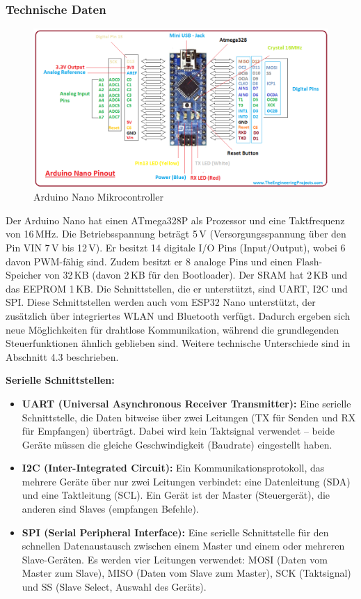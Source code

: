 \subsubsection{Technische Daten}
\begin{figure}[H]
    \centering
    \includegraphics[width=1\textwidth]{img/Hardware/arduino_nano.png}
    \caption{Arduino Nano Mikrocontroller}
    \label{fig:arduino_nano}
\end{figure}
Der Arduino Nano hat einen ATmega328P als Prozessor und eine Taktfrequenz von 16\,MHz. Die Betriebsspannung beträgt 5\,V (Versorgungsspannung über den Pin VIN 7\,V bis 12\,V). Er besitzt 14 digitale I/O Pins (Input/Output), wobei 6 davon PWM-fähig sind. Zudem besitzt er 8 analoge Pins und einen Flash-Speicher von 32\,KB (davon 2\,KB für den Bootloader). Der SRAM hat 2\,KB und das EEPROM 1\,KB. Die Schnittstellen, die er unterstützt, sind UART, I2C und SPI. Diese Schnittstellen werden auch vom ESP32 Nano unterstützt, der zusätzlich über integriertes WLAN und Bluetooth verfügt. Dadurch ergeben sich neue Möglichkeiten für drahtlose Kommunikation, während die grundlegenden Steuerfunktionen ähnlich geblieben sind. Weitere technische Unterschiede sind in Abschnitt 4.3 beschrieben.

\textbf{Serielle Schnittstellen:}
\begin{itemize}
  \item \textbf{UART (Universal Asynchronous Receiver Transmitter):} Eine serielle Schnittstelle, die Daten bitweise über zwei Leitungen (TX für Senden und RX für Empfangen) überträgt. Dabei wird kein Taktsignal verwendet – beide Geräte müssen die gleiche Geschwindigkeit (Baudrate) eingestellt haben.
  \item \textbf{I2C (Inter-Integrated Circuit):} Ein Kommunikationsprotokoll, das mehrere Geräte über nur zwei Leitungen verbindet: eine Datenleitung (SDA) und eine Taktleitung (SCL). Ein Gerät ist der Master (Steuergerät), die anderen sind Slaves (empfangen Befehle).
  \item \textbf{SPI (Serial Peripheral Interface):} Eine serielle Schnittstelle für den schnellen Datenaustausch zwischen einem Master und einem oder mehreren Slave-Geräten. Es werden vier Leitungen verwendet: MOSI (Daten vom Master zum Slave), MISO (Daten vom Slave zum Master), SCK (Taktsignal) und SS (Slave Select, Auswahl des Geräts).
\end{itemize}
